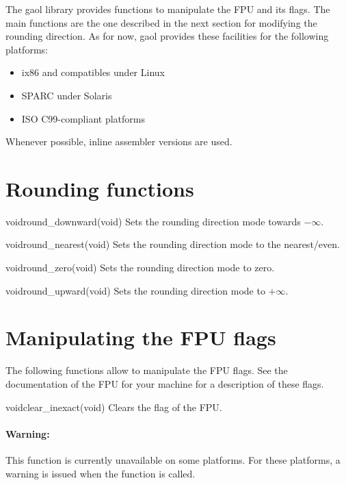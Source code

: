\documentclass{manual}
\begin{document}
The gaol library provides functions to manipulate the FPU and its
flags. The main functions are the one described in the next section
for modifying the rounding direction.  As for now, gaol provides these
facilities for the following platforms:

\begin{itemize}
\item ix86 and compatibles under Linux
\item SPARC under Solaris
\item ISO C99-compliant platforms
\end{itemize}

Whenever possible, inline assembler versions are used.

\section{Rounding functions}

\begin{deffun}{void}{round\_downward}{(void)}
Sets the rounding direction mode towards $-\infty$.
\end{deffun}

\begin{deffun}{void}{round\_nearest}{(void)}
  Sets the rounding direction mode to the nearest/even.
\end{deffun}

\begin{deffun}{void}{round\_zero}{(void)}
  Sets the rounding direction mode to zero.
\end{deffun}

\begin{deffun}{void}{round\_upward}{(void)}
  Sets the rounding direction mode to $+\infty$.
\end{deffun}

\section{Manipulating the FPU flags}

The following functions allow to manipulate the FPU flags. See the documentation
of the FPU for your machine for a description of these flags.

\begin{deffun}{void}{clear\_inexact}{(void)}
  Clears the  flag of the FPU.

\paragraph{Warning:} This function is currently unavailable on some platforms.
For these platforms, a warning is issued when the function is called.
\end{deffun}
\end{document}
